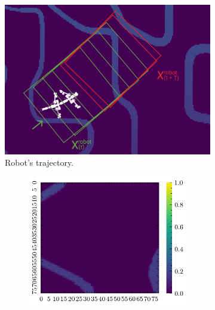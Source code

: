 \documentclass[../document.tex]{subfiles}
\begin{document}
\begin{figure}[H]
    \centering
    \begin{subfigure}[b]{0.66\textwidth}
    \includegraphics[width=\textwidth]{../img/krock-bars-correct-small.png}
    \caption{Robot's trajectory.}
\end{subfigure}
\begin{subfigure}[b]{1\textwidth}
    \begin{subfigure}[b]{0.24\textwidth}
    \includegraphics[width=\linewidth]{../img/bars1-example-patches/2d/2.png}    
    \end{subfigure}  
    \begin{subfigure}[b]{0.24\textwidth}

\end{subfigure}
\end{subfigure}
\end{figure}
\end{document}
